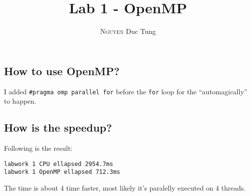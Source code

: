 \documentclass[12pt]{article}
\title{Lab 1 - OpenMP}
\author{\textsc{Nguyen} Duc Tung}
\date{}
\begin{document}
\maketitle

\subsection*{How to use OpenMP?}
I added \colorbox{backcolour}{\lstinline{#pragma omp parallel for}} before the \colorbox{backcolour}{\lstinline{for}} loop for the ``automagically'' to happen.

\subsection*{How is the speedup?}
Following is the result:

\begin{lstlisting}
labwork 1 CPU ellapsed 2954.7ms
labwork 1 OpenMP ellapsed 712.3ms
\end{lstlisting}

The time is about 4 time faster, most likely it's paralelly executed on 4 threads.
\end{document}
